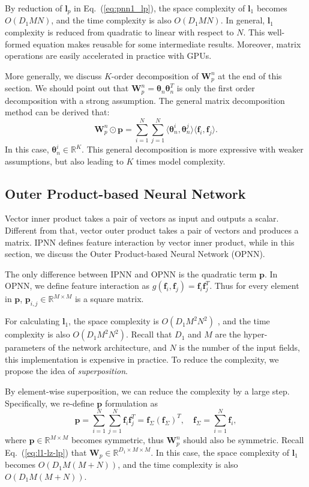 \documentclass[conference]{IEEEtran}
\newcommand{\bs}{\boldsymbol}
\newcommand{\bW}{\bs{W}}
\newcommand{\bl}{\bs{l}}
\newcommand{\bp}{\bs{p}}
\newcommand{\Bf}{\bs{f}}
\newcommand{\mR}{\mathbb{R}}
\begin{document}
By reduction of $\bl_p$ in Eq.~(\ref{eq:pnn1_lp}), the space complexity of $\bl_1$ becomes $O(D_1MN)$, and the time complexity is also $O(D_1MN)$. In general, $\bl_1$ complexity is reduced from quadratic to linear with respect to $N$. This well-formed equation makes reusable for some intermediate results. Moreover, matrix operations are easily accelerated in practice with GPUs.







More generally, we discuss $K$-order decomposition of $\bW_p^n$ at the end of this section. We should point out that $\bW_p^n = \bs\theta_n \bs\theta_n^T$ is only the first order decomposition with a strong assumption. The general matrix decomposition method can be derived that:
\begin{equation}
\bW_p^n \odot \bp = \sum_{i=1}^N {\sum_{j=1}^N \langle \bs\theta_n^i, \bs\theta_n^j\rangle \langle \Bf_i, \Bf_j \rangle}.
\end{equation}
In this case, $\bs\theta_n^i \in \mR^K$. This general decomposition is more expressive with weaker assumptions, but also leading to $K$ times model complexity.


\subsection{Outer Product-based Neural Network}\label{sec:pnn-ii}
Vector inner product takes a pair of vectors as input and outputs a scalar. Different from that, vector outer product takes a pair of vectors and produces a matrix. IPNN defines feature interaction by vector inner product, while in this section, we discuss the Outer Product-based Neural Network (OPNN).


The only difference between IPNN and OPNN is the quadratic term $\bp$.
In OPNN, we define feature interaction as $g(\Bf_i,\Bf_j) = \Bf_i \Bf_j^T$. Thus for every element in $\bp$, $\bp_{i,j} \in \mR^{M \times M}$ is a square matrix.

For calculating $\bl_1$, the space complexity is $O(D_1M^2N^2)$ , and the time complexity is also $O(D_1M^2N^2)$. Recall that $D_1$ and $M$ are the hyper-parameters of the network architecture, and $N$ is the number of the input fields, this implementation is expensive in practice. To reduce the complexity, we propose the idea of \emph{superposition}.

By element-wise superposition, we can reduce the complexity by a large step. Specifically, we re-define $\bp$ formulation as
\begin{equation}
\bp = \sum_{i=1}^{N}{\sum_{j=1}^N{\Bf_i \Bf_j^T}} = \Bf_{\Sigma} (\Bf_{\Sigma})^T, \quad \Bf_{\Sigma} = \sum_{i=1}^N {\Bf_i},
\end{equation}
where $\bp \in \mR^{M \times M}$ becomes symmetric, thus $\bW_p^n$ should also be symmetric.
Recall Eq.~(\ref{eq:l1-lz-lp}) that $\bW_p \in \mR^{D_1 \times M \times M}$. In this case, the space complexity of $\bl_1$ becomes $O(D_1M(M+N))$, and the time complexity is also $O(D_1M(M+N))$.
\end{document}
